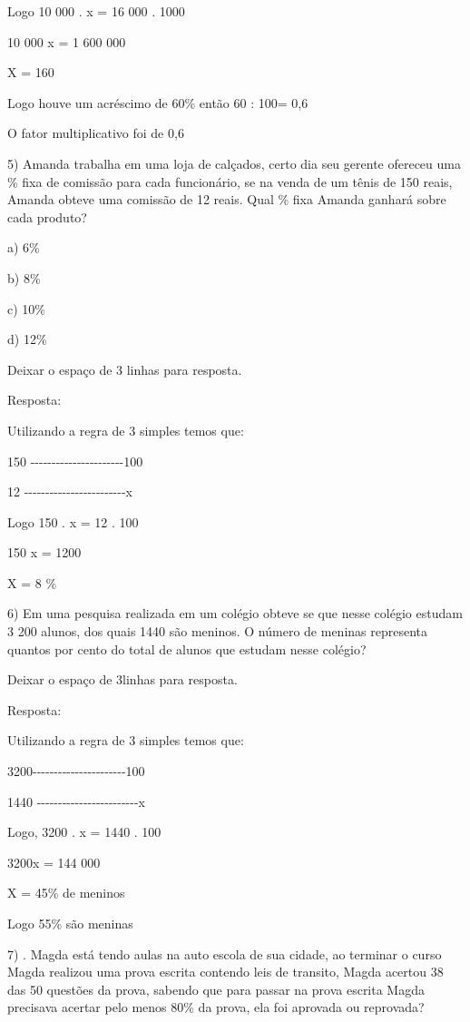 Logo 10 000 . x = 16 000 . 1000

10 000 x = 1 600 000

X = 160

Logo houve um acréscimo de 60\% então 60 : 100= 0,6

O fator multiplicativo foi de 0,6

5) Amanda trabalha em uma loja de calçados, certo dia seu gerente
ofereceu uma \% fixa de comissão para cada funcionário, se na venda de
um tênis de 150 reais, Amanda obteve uma comissão de 12 reais. Qual \%
fixa Amanda ganhará sobre cada produto?

a) 6\%

b) 8\%

c) 10\%

d) 12\%

Deixar o espaço de 3 linhas para resposta.

Resposta:

Utilizando a regra de 3 simples temos que:

150 -\/-\/-\/-\/-\/-\/-\/-\/-\/-\/-\/-\/-\/-\/-\/-\/-\/-\/-\/-\/-\/-100

12
-\/-\/-\/-\/-\/-\/-\/-\/-\/-\/-\/-\/-\/-\/-\/-\/-\/-\/-\/-\/-\/-\/-\/-x

Logo 150 . x = 12 . 100

150 x = 1200

X = 8 \%

6) Em uma pesquisa realizada em um colégio obteve se que nesse colégio
estudam 3 200 alunos, dos quais 1440 são meninos. O número de meninas
representa quantos por cento do total de alunos que estudam nesse
colégio?

Deixar o espaço de 3linhas para resposta.

Resposta:

Utilizando a regra de 3 simples temos que:

3200-\/-\/-\/-\/-\/-\/-\/-\/-\/-\/-\/-\/-\/-\/-\/-\/-\/-\/-\/-\/-\/-100

1440
-\/-\/-\/-\/-\/-\/-\/-\/-\/-\/-\/-\/-\/-\/-\/-\/-\/-\/-\/-\/-\/-\/-\/-x

Logo, 3200 . x = 1440 . 100

3200x = 144 000

X = 45\% de meninos

Logo 55\% são meninas

7) . Magda está tendo aulas na auto escola de sua cidade, ao terminar o
curso Magda realizou uma prova escrita contendo leis de transito, Magda
acertou 38 das 50 questões da prova, sabendo que para passar na prova
escrita Magda precisava acertar pelo menos 80\% da prova, ela foi
aprovada ou reprovada?

